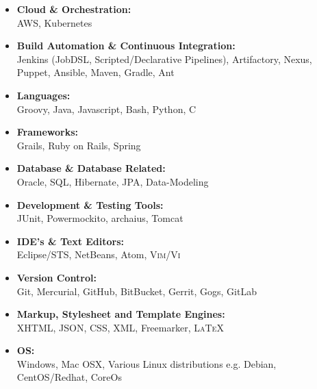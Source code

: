 \documentclass[a4paper,12pt,final,sans]{memoir}
\begin{document}
\begin{itemize}[-]
	\item	{\textbf{\color{module} Cloud \& Orchestration:} \\[-0.2em]
	AWS, Kubernetes}

	\item	{\textbf{\color{module} Build Automation \& Continuous Integration:} \\[-0.2em]
	Jenkins (JobDSL, Scripted/Declarative Pipelines), Artifactory, Nexus, Puppet, Ansible,
	Maven, Gradle, Ant}

	\item	{\textbf{\color{module} Languages:} \\[-0.2em]
	Groovy, Java, Javascript, Bash, Python, \textsc{C} }

	\item	{\textbf{\color{module} Frameworks:} \\[-0.2em]
	Grails, Ruby on Rails, Spring}

	\item	{\textbf{\color{module} Database \& Database Related:} \\[-0.2em]
	Oracle, \textsc{SQL}, Hibernate, JPA, Data-Modeling}

	\item	{\textbf{\color{module} Development \& Testing Tools:} \\[-0.2em]
	JUnit, Powermockito, archaius, Tomcat}

	\item	{\textbf{\color{module} IDE's \& Text Editors:} \\[-0.2em]
	Eclipse/\textsc{STS}, NetBeans, Atom, \textsc{Vim/Vi}}

	\item	{\textbf{\color{module} Version Control:} \\[-0.2em]
	Git, Mercurial, GitHub, BitBucket, Gerrit, Gogs, GitLab}

	\item	{\textbf{\color{module} Markup, Stylesheet and Template Engines:} \\[-0.2em]
	\textsc{XHTML}, \textsc{JSON}, \textsc{CSS}, \textsc{XML}, Freemarker, {\textsc{LaTeX}}}

	\item	{\textbf{\color{module} \textsc{OS}:} \\[-0.2em]
	Windows, Mac OSX, Various Linux distributions e.g. Debian, CentOS/Redhat, CoreOs}
\end{itemize}

\vskip1mm
\end{document}
